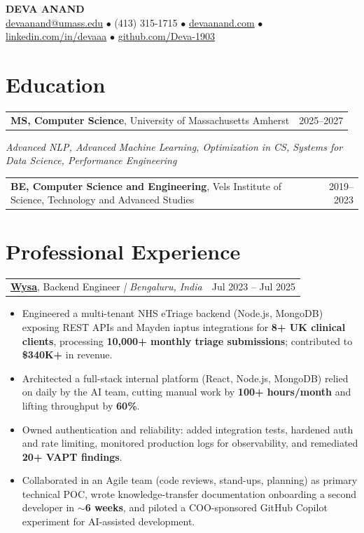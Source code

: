 \documentclass[letterpaper,11pt]{article}
\makeatletter
\newcommand{\eduItem}[3]{%
  \begin{tabular*}{\textwidth}{@{}l@{\extracolsep{\fill}}r@{}}
    \textbf{#1}, #2 & #3 \\
  \end{tabular*}\par
}
\newcommand{\expItem}[4]{%
  \vspace{3pt}
  \begin{tabular*}{\textwidth}{@{}l@{\extracolsep{\fill}}r@{}}
    \textbf{#1}, #2 \textit{| #3} & #4 \\
  \end{tabular*}\par\vspace{-2pt}
}
\makeatother
\begin{document}
\begin{center}
    {\fontsize{18}{20}\selectfont\bfseries DEVA ANAND}\\ \vspace{3pt}
    {\small
    \href{mailto:devaanand@umass.edu}{devaanand@umass.edu}
    \enspace$\bullet$\enspace
    (413) 315-1715
    \enspace$\bullet$\enspace
    \href{https://devaanand.com}{devaanand.com}
    \enspace$\bullet$\enspace
    \href{https://linkedin.com/in/devaaa/}{linkedin.com/in/devaaa}
    \enspace$\bullet$\enspace
    \href{https://github.com/Deva-1903}{github.com/Deva-1903}}
\end{center}
\vspace{-6pt}

\section{Education}
\eduItem{MS, Computer Science}{University of Massachusetts Amherst}{2025--2027}
{\small\textit{Advanced NLP, Advanced Machine Learning, Optimization in CS, Systems for Data Science, Performance Engineering}}\par
\vspace{3pt}
\eduItem{BE, Computer Science and Engineering}{Vels Institute of Science, Technology and Advanced Studies}{2019--2023}

\section{Professional Experience}

\expItem{\href{https://www.wysa.io}{Wysa}}{Backend Engineer}{Bengaluru, India}{Jul 2023 -- Jul 2025}
\begin{itemize}
  \item Engineered a multi-tenant NHS eTriage backend (Node.js, MongoDB) exposing REST APIs and Mayden iaptus integrations for \textbf{8+ UK clinical clients}, processing \textbf{10{,}000+ monthly triage submissions}; contributed to \textbf{\$340K+} in revenue.
  \item Architected a full-stack internal platform (React, Node.js, MongoDB) relied on daily by the AI team, cutting manual work by \textbf{100+ hours/month} and lifting throughput by \textbf{60\%}.
  \item Owned authentication and reliability: added integration tests, hardened auth and rate limiting, monitored production logs for observability, and remediated \textbf{20+ VAPT findings}.
  \item Collaborated in an Agile team (code reviews, stand-ups, planning) as primary technical POC, wrote knowledge-transfer documentation onboarding a second developer in \textbf{$\sim$6 weeks}, and piloted a COO-sponsored GitHub Copilot experiment for AI-assisted development.
\end{itemize}
\end{document}
